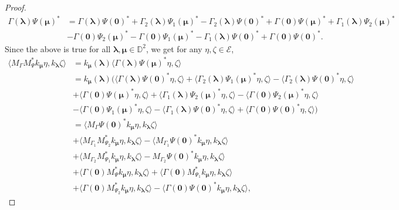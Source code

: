 \documentclass[12pt]{amsart}
\theoremstyle{definition}
\newcommand{\D}{\mathbb{D}}
\newcommand{\1}{{\mbox{\bf 1}}}
\newcommand{\cle}{\mathcal{E}}
\begin{document}
\begin{proof}
\begin{equation*}
\begin{split}
 \Gamma(\bm{\lambda})\Psi(\bm{\mu})^* &= \Gamma(\bm{\lambda}) \Psi(\bm{0})^* 
+\Gamma_{2}(\bm{\lambda}) \Psi_1({\bm{\mu}})^* 
- \Gamma_{2}(\bm{\lambda})\Psi(\bm{0})^*
+\Gamma (\bm{0}) \Psi(\bm{\mu})^* 
+ \Gamma_{1}(\bm{\lambda})\Psi_2(\bm{\mu})^*\\
&- \Gamma(\bm{0})\Psi_2(\bm{\mu})^*
- \Gamma(\bm{0})\Psi_1(\bm{\mu})^* 
-\Gamma_1(\bm{\lambda}) \Psi(\bm{0})^* 
+\Gamma(\bm{0})\Psi(\bm{0})^* .
\end{split}
\end{equation*}
Since the above is true for all $\bm{\lambda}, \bm{\mu} \in \D^2$, we get for any $\eta, \zeta \in \cle$, 
\begin{align*}
\langle M_{\Gamma}M_{\Psi}^* k_{\bm{\mu}} \eta, k_{\bm{\lambda}} \zeta \rangle &= k_{\bm{\mu}}(\bm{\lambda}) \langle  \Gamma(\bm{\lambda})\Psi(\bm{\mu})^*  \eta,  \zeta \rangle \\
&= k_{\bm{\mu}}(\bm{\lambda}) \Big( \langle \Gamma(\bm{\lambda})  \Psi(\bm{0})^* \eta,  \zeta \rangle
+ \langle \Gamma_{2}(\bm{\lambda}) \Psi_1({\bm{\mu}})^* \eta,  \zeta \rangle
- \langle \Gamma_{2}(\bm{\lambda})\Psi(\bm{0})^* \eta,  \zeta \rangle\\
&+ \langle \Gamma(\bm{0})\Psi(\bm{\mu})^* \eta,  \zeta \rangle 
+ \langle \Gamma_{1}(\bm{\lambda})\Psi_2(\bm{\mu})^* \eta,  \zeta \rangle - \langle \Gamma(\bm{0})\Psi_2(\bm{\mu})^* \eta,  \zeta \rangle \\
&- \langle \Gamma(\bm{0})\Psi_1(\bm{\mu})^* \eta,  \zeta \rangle 
- \langle \Gamma_1(\bm{\lambda}) \Psi(\bm{0})^* \eta,  \zeta \rangle
+ \langle \Gamma(\bm{0})\Psi(\bm{0})^* \eta,  \zeta \rangle \Big) \\
&=  \langle M_{\Gamma} \Psi(\bm{0})^* k_{\bm{\mu}} \eta, k_{\bm{\lambda}} \zeta \rangle\\
&+\langle M_{\Gamma_1} M_{\Psi_2}^* k_{\bm{\mu}} \eta, k_{\bm{\lambda}} \zeta \rangle - \langle M_{\Gamma_1} \Psi(\bm{0})^* k_{\bm{\mu}} \eta, k_{\bm{\lambda}} \zeta \rangle\\
&+ \langle M_{\Gamma_2} M_{\Psi_1}^*k_{\bm{\mu}} \eta, k_{\bm{\lambda}} \zeta \rangle  - M_{\Gamma_2} \Psi(\bm{0})^*k_{\bm{\mu}} \eta, k_{\bm{\lambda}} \zeta \rangle \\
& + \langle \Gamma(\bm{0}) M_{\Psi}^*k_{\bm{\mu}} \eta, k_{\bm{\lambda}} \zeta \rangle + \langle \Gamma(\bm{0}) M_{\Psi_1}^*k_{\bm{\mu}} \eta, k_{\bm{\lambda}} \zeta \rangle \\
&+ \langle \Gamma(\bm{0}) M_{\Psi_2}^*k_{\bm{\mu}} \eta, k_{\bm{\lambda}} \zeta \rangle - \langle \Gamma(\bm{0}) \Psi(\bm{0})^*k_{\bm{\mu}} \eta, k_{\bm{\lambda}} \zeta \rangle,

\end{align*}
\end{proof}
\end{document}
